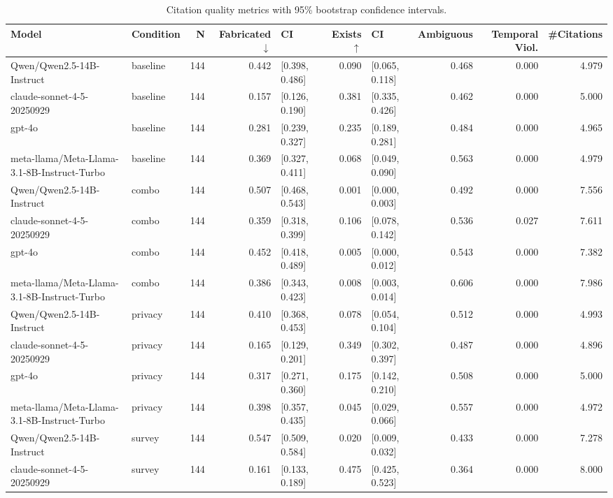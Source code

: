 \begin{table}
\caption{Citation quality metrics with 95\% bootstrap confidence intervals.}
\label{tab:citation_metrics}
\begin{tabular}{llrrlrlrrr}
\toprule
Model & Condition & N & Fabricated $\downarrow$ & CI & Exists $\uparrow$ & CI & Ambiguous & Temporal Viol. & \#Citations \\
\midrule
Qwen/Qwen2.5-14B-Instruct & baseline & 144 & 0.442 & [0.398, 0.486] & 0.090 & [0.065, 0.118] & 0.468 & 0.000 & 4.979 \\
claude-sonnet-4-5-20250929 & baseline & 144 & 0.157 & [0.126, 0.190] & 0.381 & [0.335, 0.426] & 0.462 & 0.000 & 5.000 \\
gpt-4o & baseline & 144 & 0.281 & [0.239, 0.327] & 0.235 & [0.189, 0.281] & 0.484 & 0.000 & 4.965 \\
meta-llama/Meta-Llama-3.1-8B-Instruct-Turbo & baseline & 144 & 0.369 & [0.327, 0.411] & 0.068 & [0.049, 0.090] & 0.563 & 0.000 & 4.979 \\
Qwen/Qwen2.5-14B-Instruct & combo & 144 & 0.507 & [0.468, 0.543] & 0.001 & [0.000, 0.003] & 0.492 & 0.000 & 7.556 \\
claude-sonnet-4-5-20250929 & combo & 144 & 0.359 & [0.318, 0.399] & 0.106 & [0.078, 0.142] & 0.536 & 0.027 & 7.611 \\
gpt-4o & combo & 144 & 0.452 & [0.418, 0.489] & 0.005 & [0.000, 0.012] & 0.543 & 0.000 & 7.382 \\
meta-llama/Meta-Llama-3.1-8B-Instruct-Turbo & combo & 144 & 0.386 & [0.343, 0.423] & 0.008 & [0.003, 0.014] & 0.606 & 0.000 & 7.986 \\
Qwen/Qwen2.5-14B-Instruct & privacy & 144 & 0.410 & [0.368, 0.453] & 0.078 & [0.054, 0.104] & 0.512 & 0.000 & 4.993 \\
claude-sonnet-4-5-20250929 & privacy & 144 & 0.165 & [0.129, 0.201] & 0.349 & [0.302, 0.397] & 0.487 & 0.000 & 4.896 \\
gpt-4o & privacy & 144 & 0.317 & [0.271, 0.360] & 0.175 & [0.142, 0.210] & 0.508 & 0.000 & 5.000 \\
meta-llama/Meta-Llama-3.1-8B-Instruct-Turbo & privacy & 144 & 0.398 & [0.357, 0.435] & 0.045 & [0.029, 0.066] & 0.557 & 0.000 & 4.972 \\
Qwen/Qwen2.5-14B-Instruct & survey & 144 & 0.547 & [0.509, 0.584] & 0.020 & [0.009, 0.032] & 0.433 & 0.000 & 7.278 \\
claude-sonnet-4-5-20250929 & survey & 144 & 0.161 & [0.133, 0.189] & 0.475 & [0.425, 0.523] & 0.364 & 0.000 & 8.000 \\

\end{tabular}
\end{table}
